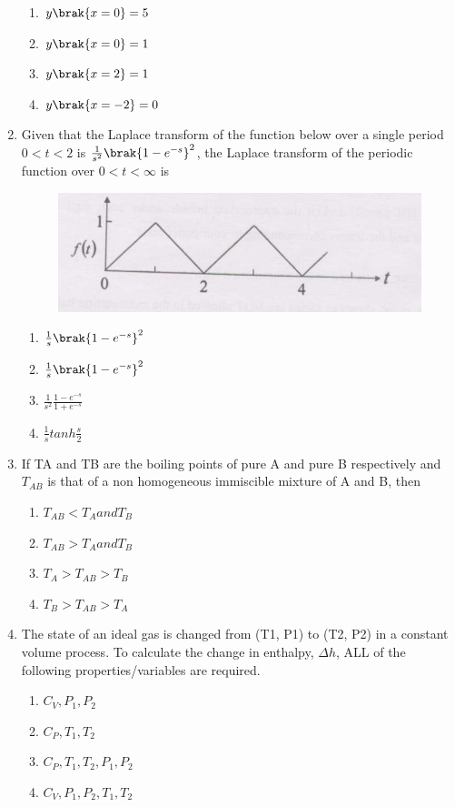 \documentclass[journal,12pt,onecolumn]{IEEEtran}
\theoremstyle{remark}
\begin{document}
\begin{enumerate}
\begin{enumerate}
    \item $y\brak{x=0}=5$
    \item $y\brak{x=0}=1$
    \item $y\brak{x=2}=1$
    \item $y\brak{x=-2}=0$
\end{enumerate}
\newpage
    \item Given that the Laplace transform of the function below over a single period $0<t<2$ is $\frac{1}{s^2}\brak{1-e^{-s}}^2$, the Laplace transform of the periodic function over $0<t<\infty$ is 
\begin{figure}[H]
    \centering
    \includegraphics[width=0.5\columnwidth]{figs/4.png}
    \caption{}
    \label{fig:4}
\end{figure}

\begin{enumerate}
    \item $\frac{1}{s}\brak{1-e^{-s}}^2$
    \item $\frac{1}{s}\brak{1-e^{-s}}^2$
    \item $\frac{1}{s^2}\frac{1-e^{-s}}{1+e^{-s}}$
    \item $\frac{1}{s}tanh\frac{s}{2}$
\end{enumerate}

    \item If TA and TB are the boiling points of pure A and pure B respectively and $T_{AB}$ is that of a non homogeneous immiscible mixture of A and B, then

\begin{enumerate}
    \item $T_{AB}<T_A and T_B$
    \item $T_{AB}>T_A and T_B$
    \item $T_A>T_{AB}>T_B$
    \item $T_B>T_{AB}>T_A$
\end{enumerate}

    \item The state of an ideal gas is changed from (T1, P1) to (T2, P2) in a constant volume process. To calculate the change in enthalpy, $\Delta h$, ALL of the following properties/variables are required.

\begin{enumerate}
    \item $C_V,P_1,P_2$
    \item $C_P,T_1,T_2$
    \item $C_P,T_1,T_2,P_1,P_2$
    \item $C_V,P_1,P_2,T_1,T_2$
\end{enumerate}


\end{enumerate}
\end{document}
